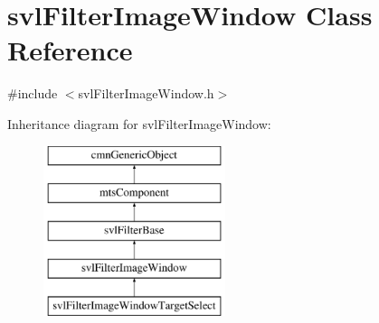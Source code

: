\hypertarget{classsvl_filter_image_window}{}\section{svl\+Filter\+Image\+Window Class Reference}
\label{classsvl_filter_image_window}


{\ttfamily \#include $<$svl\+Filter\+Image\+Window.\+h$>$}

Inheritance diagram for svl\+Filter\+Image\+Window\+:\begin{figure}[H]
\begin{center}
\leavevmode
\includegraphics[height=5.000000cm]{d3/db2/classsvl_filter_image_window}
\end{center}
\end{figure}

